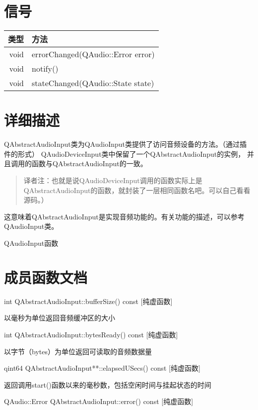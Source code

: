 \section{信号}

\begin{tabular}{|r|l|}
	\hline
	类型 & 方法 \\
	\hline
	void & errorChanged(QAudio::Error error)\\      
	\hline
	void & notify()\\
	\hline
	void & stateChanged(QAudio::State state)\\      
        \hline
\end{tabular}

\section{详细描述}

QAbstractAudioInput类为QAudioInput类提供了访问音频设备的方法。（通过插
件的形式） QAudioDeviceInput类中保留了一个QAbstractAudioInput的实例，
并且调用的函数与QAbstractAudioInput的一致。

\begin{quote}
译者注：也就是说QAudioDeviceInput调用的函数实际上是QAbstractAudioInput的函数，就封装了一层相同函数名吧。可以自己看看源码。）
\end{quote}

这意味着QAbstractAudioInput是实现音频功能的。有关功能的描述，可以参考
QAudioInput类。 

\begin{seeAlso}
QAudioInput函数
\end{seeAlso}

\section{成员函数文档}

int QAbstractAudioInput::bufferSize() const [纯虚函数]

以毫秒为单位返回音频缓冲区的大小

int QAbstractAudioInput::bytesReady() const [纯虚函数]

以字节（bytes）为单位返回可读取的音频数据量

qint64 QAbstractAudioInput**::elapsedUSecs() const [纯虚函数]

返回调用start()函数以来的毫秒数，包括空闲时间与挂起状态的时间

QAudio::Error QAbstractAudioInput::error() const [纯虚函数]

